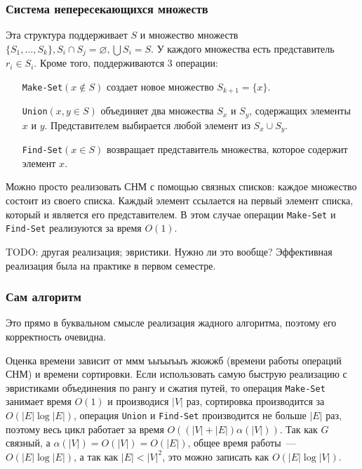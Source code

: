 \subsubsection{Система непересекающихся множеств}
Эта структура поддерживает $S$ и множество множеств $\{S_1,\ldots,S_k\},S_i\cap S_j=\varnothing,\bigcup S_i=S$. У каждого множества есть представитель $r_i\in S_i$. Кроме того, поддерживаются 3 операции:
\begin{itemize}
	\item[{\tt Make-Set}$(x\not\in S)$] создает новое множество $S_{k+1}=\{x\}$.
	\item[{\tt Union}$(x,y\in S)$] объединяет два множества $S_x$ и $S_y$, содержащих элементы $x$ и $y$. Представителем выбирается любой элемент из $S_x\cup S_y$.
	\item[{\tt Find-Set}$(x\in S)$] возвращает представитель множества, которое содержит элемент $x$.
\end{itemize}
Можно просто реализовать СНМ с помощью связных списков: каждое множество состоит из своего списка. Каждый элемент ссылается на первый элемент списка, который и является его представителем. В этом случае операции {\tt Make-Set} и {\tt Find-Set} реализуются за время $O(1)$.

TODO: другая реализация; эвристики. Нужно ли это вообще? Эффективная реализация была на практике в первом семестре.
\subsubsection{Сам алгоритм}
\begin{algorithm}[H]
	\DontPrintSemicolon
\end{algorithm}
Это прямо в буквальном смысле реализация жадного алгоритма, поэтому его корректность очевидна.

Оценка времени зависит от ммм ъыъыъыъ жюжжб (времени работы операций СНМ) и времени сортировки. Если использовать самую быструю реализацию с эвристиками объединения по рангу и сжатия путей, то операция {\tt Make-Set} занимает время $O(1)$ и производися $|V|$ раз, сортировка производится за $O(|E|\log |E|)$, операция {\tt Union} и {\tt Find-Set} производится не больше $|E|$ раз, поэтому весь цикл работает за время $O((|V|+|E|)\alpha(|V|))$. Так как $G$ связный, а $\alpha(|V|)=O(|V|)=O(|E|)$, общее время работы~--- $O(|E|\log|E|)$, а так как $|E|<|V|^2$, это можно записать как $O(|E|\log|V|)$.
